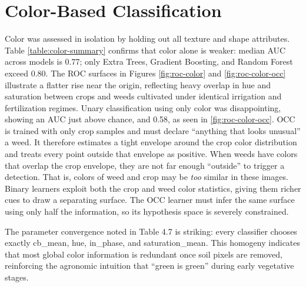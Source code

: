 \documentclass[letterpaper, notitlepage]{report}
\begin{document}

\section{Color-Based Classification}
Color was assessed in isolation by holding out all texture and shape attributes. Table \ref{table:color-summary} confirms that color
alone is weaker: median AUC across models is 0.77; only Extra Trees, Gradient Boosting, and Random Forest exceed
0.80. The ROC surfaces in Figures \ref{fig:roc-color} and \ref{fig:roc-color-occ} illustrate a flatter rise near the origin, reflecting heavy overlap in
hue and saturation between crops and weeds cultivated under identical irrigation and fertilization regimes.
Unary classification using only color was disappointing, showing an AUC just above chance, and 0.58, as seen in \ref{fig:roc-color-occ}.
\gls{OCC} is trained with only crop samples and must declare “anything that looks unusual” a weed. It therefore estimates a tight envelope around the crop color distribution and treats every point outside that envelope as positive. When weeds have colors that overlap the crop envelope, they are not far enough “outside” to trigger a detection. That is, colors of weed and crop may be \textit{too} similar in these images. Binary learners exploit both the crop and weed color statistics, giving them richer cues to draw a separating surface. The \gls{OCC} learner must infer the same surface using only half the information, so its hypothesis space is severely constrained.

The parameter convergence noted in Table 4.7 is striking: every classifier chooses exactly cb\_mean, hue,
in\_phase, and saturation\_mean. This homogeny indicates that most global color information is redundant
once soil pixels are removed, reinforcing the agronomic intuition that “green is green” during early vegetative
stages. 
\end{document}
